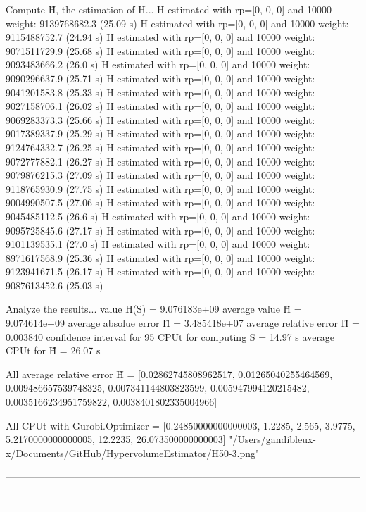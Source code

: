 Compute H̃, the estimation of H...
  H estimated with rp=[0, 0, 0] and 10000 weight:  9139768682.3  (25.09 s)
  H estimated with rp=[0, 0, 0] and 10000 weight:  9115488752.7  (24.94 s)
  H estimated with rp=[0, 0, 0] and 10000 weight:  9071511729.9  (25.68 s)
  H estimated with rp=[0, 0, 0] and 10000 weight:  9093483666.2  (26.0 s)
  H estimated with rp=[0, 0, 0] and 10000 weight:  9090296637.9  (25.71 s)
  H estimated with rp=[0, 0, 0] and 10000 weight:  9041201583.8  (25.33 s)
  H estimated with rp=[0, 0, 0] and 10000 weight:  9027158706.1  (26.02 s)
  H estimated with rp=[0, 0, 0] and 10000 weight:  9069283373.3  (25.66 s)
  H estimated with rp=[0, 0, 0] and 10000 weight:  9017389337.9  (25.29 s)
  H estimated with rp=[0, 0, 0] and 10000 weight:  9124764332.7  (26.25 s)
  H estimated with rp=[0, 0, 0] and 10000 weight:  9072777882.1  (26.27 s)
  H estimated with rp=[0, 0, 0] and 10000 weight:  9079876215.3  (27.09 s)
  H estimated with rp=[0, 0, 0] and 10000 weight:  9118765930.9  (27.75 s)
  H estimated with rp=[0, 0, 0] and 10000 weight:  9004990507.5  (27.06 s)
  H estimated with rp=[0, 0, 0] and 10000 weight:  9045485112.5  (26.6 s)
  H estimated with rp=[0, 0, 0] and 10000 weight:  9095725845.6  (27.17 s)
  H estimated with rp=[0, 0, 0] and 10000 weight:  9101139535.1  (27.0 s)
  H estimated with rp=[0, 0, 0] and 10000 weight:  8971617568.9  (25.36 s)
  H estimated with rp=[0, 0, 0] and 10000 weight:  9123941671.5  (26.17 s)
  H estimated with rp=[0, 0, 0] and 10000 weight:  9087613452.6  (25.03 s)

Analyze the results...
  value H(S)                  = 9.076183e+09 
  average value H̃             = 9.074614e+09 
  average absolue error H̃     = 3.485418e+07 
  average relative error H̃    = 0.003840 
  confidence interval for 95%
  CPUt for computing S         = 14.97 s
  average CPUt for H̃           = 26.07 s

All average relative error H̃ = [0.02862745808962517, 0.01265040255464569, 0.009486657539748325, 0.007341144803823599, 0.005947994120215482, 0.0035166234951759822, 0.0038401802335004966]

All CPUt with Gurobi.Optimizer = [0.24850000000000003, 1.2285, 2.565, 3.9775, 5.2170000000000005, 12.2235, 26.073500000000003]
"/Users/gandibleux-x/Documents/GitHub/HypervolumeEstimator/H50-3.png"

--------------------------------------------------------------------------------------------------------------------------------------------------------------------------------------------------------------------------------


